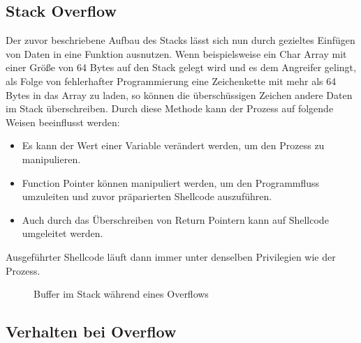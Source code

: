 \subsection{Stack Overflow}
Der zuvor beschriebene Aufbau des Stacks lässt sich nun durch gezieltes Einfügen von Daten in eine Funktion ausnutzen.
Wenn beispielsweise ein Char Array mit einer Größe von 64 Bytes auf den Stack gelegt wird und es dem Angreifer gelingt,
als Folge von fehlerhafter Programmierung eine Zeichenkette mit mehr als 64 Bytes in das Array zu laden, so können
die überschüssigen Zeichen andere Daten im Stack überschreiben. Durch diese Methode kann der Prozess auf folgende
Weisen beeinflusst werden:
\begin{itemize}
    \item Es kann der Wert einer Variable verändert werden, um den Prozess zu manipulieren.
    \item Function Pointer können manipuliert werden, um den Programmfluss umzuleiten und zuvor präparierten Shellcode auszuführen.
    \item Auch durch das Überschreiben von Return Pointern kann auf Shellcode umgeleitet werden.
\end{itemize}

Ausgeführter Shellcode läuft dann immer unter denselben Privilegien wie der Prozess.
\begin{figure}[h]%
    \centering
    \qquad
    \caption{Buffer im Stack während eines Overflows}%
    \label{fig:example}%
\end{figure}

\subsection{Verhalten bei Overflow}


